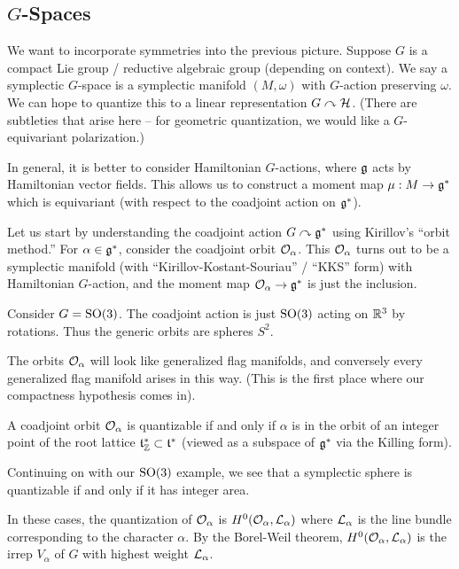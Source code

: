 \documentclass{article}
\begin{document}
\subsection{$G$-Spaces}

We want to incorporate symmetries into the previous picture.
Suppose $G$ is a compact Lie group / reductive algebraic group (depending on context).
We say a symplectic $G$-space is a symplectic manifold $(M, \omega)$ with $G$-action preserving $\omega$.
We can hope to quantize this to a linear representation $G \curvearrowright \mathcal{H}$.
(There are subtleties that arise here -- for geometric quantization, we would like a $G$-equivariant polarization.)

In general, it is better to consider Hamiltonian $G$-actions, where $\mathfrak{g}$ acts by Hamiltonian vector fields.
This allows us to construct a moment map $\mu: M \to \mathfrak{g}^*$ which is equivariant (with respect to the coadjoint action on $\mathfrak{g}^*$).

Let us start by understanding the coadjoint action $G \curvearrowright \mathfrak{g}^*$ using Kirillov's ``orbit method.''
For $\alpha \in \mathfrak{g}^*$, consider the coadjoint orbit $\mathcal{O}_\alpha$.
This $\mathcal{O}_\alpha$ turns out to be a symplectic manifold (with ``Kirillov-Kostant-Souriau'' / ``KKS'' form) with Hamiltonian $G$-action, and the moment map $\mathcal{O}_\alpha \to \mathfrak{g}^*$ is just the inclusion.

\begin{ex}
	Consider $G = \operatorname{SO}(3)$.
	The coadjoint action is just $\operatorname{SO}(3)$ acting on $\mathbb{R}^3$ by rotations.
	Thus the generic orbits are spheres $S^2$.
\end{ex}

The orbits $\mathcal{O}_\alpha$ will look like generalized flag manifolds, and conversely every generalized flag manifold arises in this way.
(This is the first place where our compactness hypothesis comes in).

\begin{prop}
	A coadjoint orbit $\mathcal{O}_\alpha$ is quantizable if and only if $\alpha$ is in the orbit of an integer point of the root lattice $\mathfrak{t}_{\mathbb{Z}}^* \subset \mathfrak{t}^*$ (viewed as a subspace of $\mathfrak{g}^*$ via the Killing form).
\end{prop}

\begin{ex}
	Continuing on with our $\operatorname{SO}(3)$ example, we see that a symplectic sphere is quantizable if and only if it has integer area.
\end{ex}

In these cases, the quantization of $\mathcal{O}_\alpha$ is $H^0(\mathcal{O}_\alpha, \mathcal{L}_\alpha)$ where $\mathcal{L}_\alpha$ is the line bundle corresponding to the character $\alpha$.
By the Borel-Weil theorem, $H^0(\mathcal{O}_\alpha, \mathcal{L}_\alpha)$ is the irrep $V_\alpha$ of $G$ with highest weight $\mathcal{L}_\alpha$.
\end{document}
